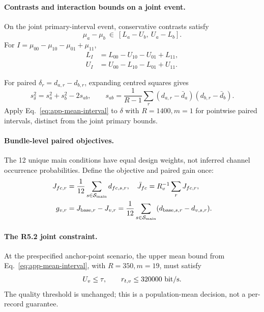 \paragraph{Contrasts and interaction bounds on a joint event.}
On the joint primary-interval event, conservative contrasts satisfy
\begin{equation}
 \mu_a-\mu_b\ \in\ [L_a-U_b,\ U_a-L_b].
 \label{eq:r43-contrast}
\end{equation}
For $I=\mu_{00}-\mu_{10}-\mu_{01}+\mu_{11}$,
\begin{align}
 L_I&=L_{00}-U_{10}-U_{01}+L_{11},\nonumber\\
 U_I&=U_{00}-L_{10}-L_{01}+U_{11}.
 \label{eq:r43-interaction-ci}
\end{align}

For paired $\delta_r=d_{a,r}-d_{b,r}$, expanding centred squares gives
\begin{equation}
 s_\delta^2=s_a^2+s_b^2-2s_{ab},\qquad
 s_{ab}=\frac1{R-1}\sum_r(d_{a,r}-\bar d_a)(d_{b,r}-\bar d_b).
 \label{eq:r43-paired-ci}
\end{equation}
Apply Eq.~\eqref{eq:app-mean-interval} to $\delta$ with $R=1400,m=1$
for pointwise paired intervals, distinct from the joint primary bounds.

\paragraph{Bundle-level paired objectives.}
The 12 unique main conditions have equal design weights, not inferred
channel occurrence probabilities. Define the objective and paired gain once:
\begin{align}
 J_{fc,r}&=\frac1{12}\sum_{s\in\mathcal S_{\rm main}}d_{fc,s,r},\quad
 \bar J_{fc}=R_v^{-1}\sum_rJ_{fc,r},\label{eq:r42-objective}\\
 g_{v,r}&=J_{{\rm base},r}-J_{v,r}
 =\frac1{12}\sum_{s\in\mathcal S_{\rm main}}(d_{{\rm base},s,r}-d_{v,s,r}).
 \label{eq:r51-gain}
\end{align}

\paragraph{The R5.2 joint constraint.}
At the prespecified anchor-point scenario, the upper mean bound from
Eq.~\eqref{eq:app-mean-interval}, with $R=350,m=19$, must satisfy
\begin{equation}
 U_v\leq\tau,\qquad r_{t,v}\leq320000\ {\rm bit/s}.
 \label{eq:r52-quality}
\end{equation}
The quality threshold is unchanged; this is a population-mean decision,
not a per-record guarantee.


